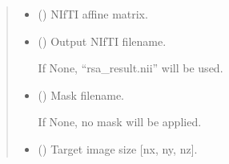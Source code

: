 \documentclass[letterpaper,10pt,english]{sphinxhowto}
\begin{document}
\begin{fulllineitems}
\begin{quote}
\begin{description}
\begin{itemize}
\sphinxAtStartPar
The last dimension contains:
\begin{itemize}
\item {} 
\sphinxAtStartPar
results{[}…, 0{]} : value map, such as r\sphinxhyphen{}values or t\sphinxhyphen{}values

\item {} 
\sphinxAtStartPar
results{[}…, 1{]} : p\sphinxhyphen{}values

\end{itemize}


\item {} 
\sphinxAtStartPar
{} (\sphinxstyleliteralemphasis{\sphinxupquote{, }}\sphinxstyleliteralemphasis{\sphinxupquote{ {[}}}\sphinxstyleliteralemphasis{\sphinxupquote{, }}\sphinxstyleliteralemphasis{\sphinxupquote{{]}}}) \textendash{} NIfTI affine matrix.

\item {} 
\sphinxAtStartPar
{} (\sphinxstyleliteralemphasis{\sphinxupquote{, }}) \textendash{} 
\sphinxAtStartPar
Output NIfTI filename.

\sphinxAtStartPar
If None, “rsa\_result.nii” will be used.


\item {} 
\sphinxAtStartPar
{} (\sphinxstyleliteralemphasis{\sphinxupquote{, }}\sphinxstyleliteralemphasis{\sphinxupquote{(}}\sphinxstyleliteralemphasis{\sphinxupquote{)}}) \textendash{} 
\sphinxAtStartPar
Mask filename.

\sphinxAtStartPar
If None, no mask will be applied.


\item {} 
\sphinxAtStartPar
{} (\sphinxstyleliteralemphasis{\sphinxupquote{, }}\sphinxstyleliteralemphasis{\sphinxupquote{(}}\sphinxstyleliteralemphasis{\sphinxupquote{, }}\sphinxstyleliteralemphasis{\sphinxupquote{, }}\sphinxstyleliteralemphasis{\sphinxupquote{)}}) \textendash{} Target image size {[}nx, ny, nz{]}.


\end{itemize}
\end{description}
\end{quote}
\end{fulllineitems}
\end{document}
